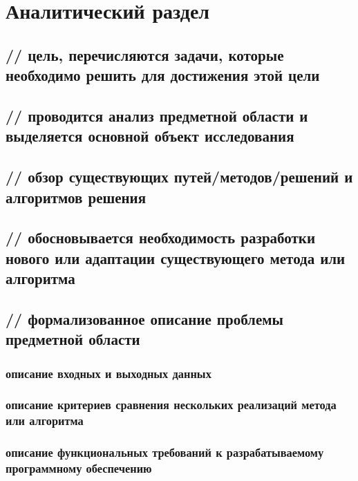 \chapter{Аналитический раздел}

%
\section{// цель, перечисляются задачи, которые необходимо решить для достижения этой цели}

%
\section{// проводится анализ предметной области и выделяется основной объект исследования}

%
\section{// обзор существующих путей/методов/решений и алгоритмов решения}


%
\section{// обосновывается необходимость разработки нового или адаптации существующего метода или алгоритма}

%
\section{// формализованное описание проблемы предметной области}

\subsection{описание входных и выходных данных}

\subsection{описание критериев сравнения нескольких реализаций метода или алгоритма}

\subsection{описание функциональных требований к разрабатываемому программному
обеспечению}
